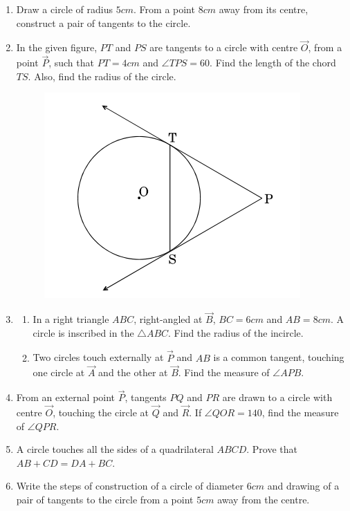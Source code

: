 \begin{enumerate}
\begin{figure}[H]
			\caption{}
			\label{fig:circ-2}
		\end{figure}
	\item Draw a circle of radius $5 cm$. From a point $8 cm$ away from its centre, construct a pair of tangents to the circle.
	\item In the given figure, $PT$ and $PS$ are tangents to a circle with centre $\vec{O}$, from a point $\vec{P}$, such that $PT = 4 cm$ and $\angle TPS = 60$\degree. Find the length of the chord $TS$. Also, find the radius of the circle.
		\begin{figure}[H]
			\centering
			\includegraphics[width=\columnwidth]{figs/circ-3.png}
			\caption{}
			\label{fig:circ-3}
		\end{figure}
	\item \begin{enumerate}[label=(\alph*)]
			\item In a right triangle $ABC$, right-angled at $\vec{B}$, $BC = 6 cm$ and $AB = 8 cm$. A circle is inscribed in the $\triangle ABC$. Find the radius of the incircle.
			\item Two circles touch externally at $\vec{P}$ and $AB$ is a common tangent, touching one circle at $\vec{A}$ and the other at $\vec{B}$. Find the measure of $\angle APB$.
		\end{enumerate}
	\item From an external point $\vec{P}$, tangents $PQ$ and $PR$ are drawn to a circle with centre $\vec{O}$, touching the circle at $\vec{Q}$ and $\vec{R}$. If $\angle QOR = 140$\degree, find the measure of $\angle QPR$.
	\item A circle touches all the sides of a quadrilateral $ABCD$. Prove that $AB + CD = DA + BC$.
	\item Write the steps of construction of a circle of diameter $6 cm$ and drawing of a pair of tangents to the circle from a point $5 cm$ away from the centre.
\end{enumerate}
                                                                                
